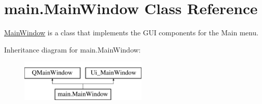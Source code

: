 \hypertarget{classmain_1_1_main_window}{}\section{main.\+Main\+Window Class Reference}
\label{classmain_1_1_main_window}


\hyperlink{classmain_1_1_main_window}{Main\+Window} is a class that implements the G\+UI components for the Main menu.  


Inheritance diagram for main.\+Main\+Window\+:\begin{figure}[H]
\begin{center}
\leavevmode
\includegraphics[height=2.000000cm]{classmain_1_1_main_window}
\end{center}
\end{figure}
